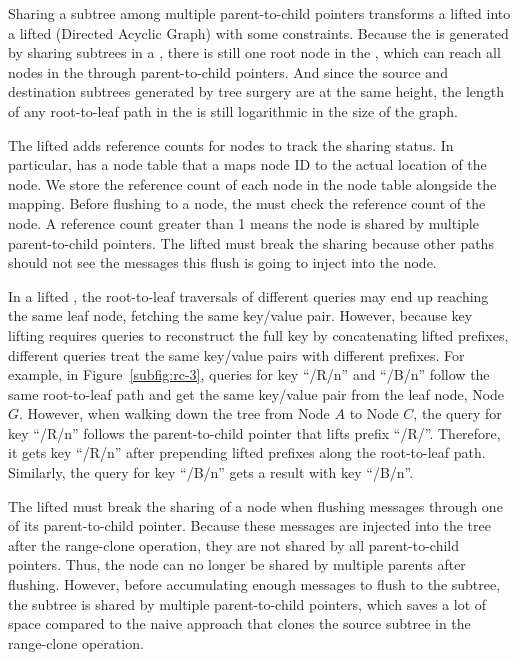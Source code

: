 Sharing a subtree among multiple parent-to-child pointers transforms a lifted
\bet into a lifted \bedag (Directed Acyclic Graph) with some constraints.
Because the \bedag is generated by sharing subtrees in a \bet,
there is still one root node in the \bedag,
which can reach all nodes in the \bedag through parent-to-child pointers.
And since the source and destination subtrees generated by tree surgery are at
the same height, the length of any root-to-leaf path in the \bedag is still
logarithmic in the size of the graph.

The lifted \bedag adds reference counts for \bet nodes to track the sharing
status.
In particular, \fti has a node table that a maps node ID to
the actual location of the node.
We store the reference count of each node in the node table alongside
the mapping.
Before flushing to a node, the \bedag must check the reference count of the node.
A reference count greater than 1 means the node is shared by multiple
parent-to-child pointers.
The lifted \bedag must break the sharing because other paths should not see the
messages this flush is going to inject into the node.

In a lifted \bedag, the root-to-leaf traversals of different queries may end up
reaching the same leaf node, fetching the same key/value pair.
However, because key lifting requires queries to reconstruct the full key by
concatenating lifted prefixes, different queries treat the same key/value pairs
with different prefixes.
For example, in Figure~\ref{subfig:rc-3}, queries for key ``/R/n'' and ``/B/n''
follow the same root-to-leaf path and get the same key/value pair from the
leaf node, Node $G$.
However, when walking down the tree from Node $A$ to Node $C$, the query for
key ``/R/n'' follows the parent-to-child pointer that lifts prefix ``/R/''.
Therefore, it gets key ``/R/n'' after prepending lifted prefixes along the
root-to-leaf path.
Similarly, the query for key ``/B/n'' gets a result with key ``/B/n''.

The lifted \bedag must break the sharing of a node when flushing messages
through one of its parent-to-child pointer.
Because these messages are injected into the tree after the range-clone
operation, they are not shared by all parent-to-child pointers.
Thus, the node can no longer be shared by multiple parents after flushing.
However, before accumulating enough messages to flush to the subtree,
the subtree is shared by multiple parent-to-child pointers,
which saves a lot of space compared to the naive approach that clones
the source subtree in the range-clone operation.


